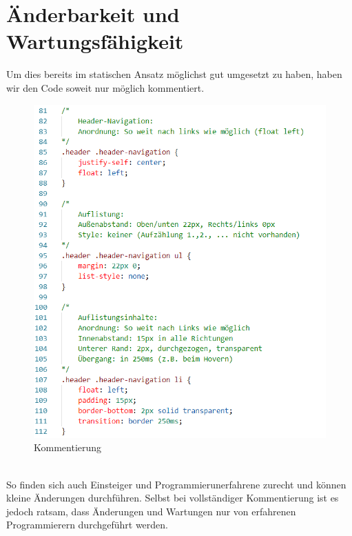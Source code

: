 \documentclass[12pt,a4paper]{article}
\begin{document}
\section{Änderbarkeit und Wartungsfähigkeit}
Um dies bereits im statischen Ansatz möglichst gut umgesetzt zu haben, haben wir den Code soweit nur möglich kommentiert.\\
\begin{figure}[!htbp]
	\includegraphics[scale=1.1]{Kommentierung.png}
	\caption{Kommentierung}
	\label{img:Kommentierung}
\end{figure}\\
So finden sich auch Einsteiger und Programmierunerfahrene zurecht und können kleine Änderungen durchführen. Selbst bei vollständiger Kommentierung ist es jedoch ratsam, dass Änderungen und Wartungen nur von erfahrenen Programmierern durchgeführt werden.
\newpage
\end{document}
